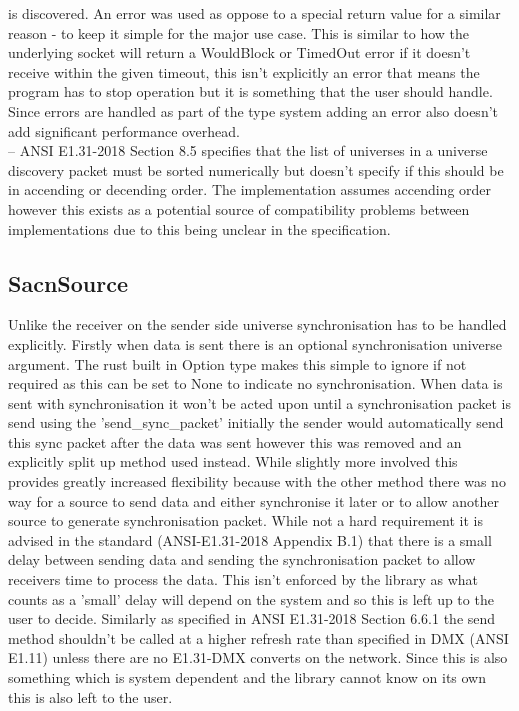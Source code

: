 \documentclass[11pt,a4paper]{report}
\begin{document}
is discovered. An error was used as oppose to a special return value for a similar reason - to keep it simple for the major use case. This is similar to how the underlying socket will return a WouldBlock or TimedOut error if it doesn't receive within the given timeout, this isn't explicitly an error that means the program has to stop operation but it is something that the user should handle. Since errors are handled as part of the type system adding an error also doesn't add significant performance overhead. \\

-- ANSI E1.31-2018 Section 8.5 specifies that the list of universes in a universe discovery packet must be sorted numerically but doesn't specify if this should be in accending or decending order. The implementation assumes accending order however this exists as a potential source of compatibility problems between implementations due to this being unclear in the specification.


\subsection{SacnSource}
Unlike the receiver on the sender side universe synchronisation has to be handled explicitly. Firstly when data is sent there is an optional synchronisation universe argument. The rust built in Option type makes this simple to ignore if not required as this can be set to None to indicate no synchronisation. When data is sent with synchronisation it won't be acted upon until a synchronisation packet is send using the 'send\_sync\_packet' initially the sender would automatically send this sync packet after the data was sent however this was removed and an explicitly split up method used instead. While slightly more involved this provides greatly increased flexibility because with the other method there was no way for a source to send data and either synchronise it later or to allow another source to generate synchronisation packet. While not a hard requirement it is advised in the standard (ANSI-E1.31-2018 Appendix B.1) that there is a small delay between sending data and sending the synchronisation packet to allow receivers time to process the data. This isn't enforced by the library as what counts as a 'small' delay will depend on the system and so this is left up to the user to decide. Similarly as specified in ANSI E1.31-2018 Section 6.6.1 the send method shouldn't be called at a higher refresh rate than specified in DMX (ANSI E1.11) unless there are no E1.31-DMX converts on the network. Since this is also something which is system dependent and the library cannot know on its own this is also left to the user.\\
\end{document}
